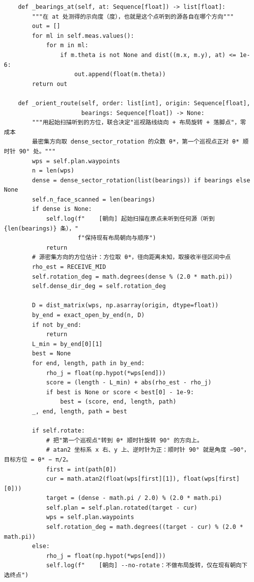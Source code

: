 \documentclass[UTF8, zihao=5,AutoFakeBold=2]{ctexart}
\begin{document}
\begin{lstlisting}
    def _bearings_at(self, at: Sequence[float]) -> list[float]:
        """在 at 处测得的示向度（度），也就是这个点听到的源各自在哪个方向"""
        out = []
        for ml in self.meas.values():
            for m in ml:
                if m.theta is not None and dist((m.x, m.y), at) <= 1e-6:
                    out.append(float(m.theta))
        return out

    def _orient_route(self, order: list[int], origin: Sequence[float],
                      bearings: Sequence[float]) -> None:
        """用起始扫描听到的方位，联合决定"巡视路线绕向 + 布局旋转 + 落脚点"，零成本
        最密集方向取 dense_sector_rotation 的众数 θ*，第一个巡视点正对 θ* 顺时针 90° 处。"""
        wps = self.plan.waypoints
        n = len(wps)
        dense = dense_sector_rotation(list(bearings)) if bearings else None
        self.n_face_scanned = len(bearings)
        if dense is None:
            self.log(f"    [朝向] 起始扫描在原点未听到任何源（听到 {len(bearings)} 条），"
                     f"保持现有布局朝向与顺序")
            return
        # 源密集方向的方位估计：方位取 θ*，径向距离未知，取接收半径区间中点
        rho_est = RECEIVE_MID
        self.rotation_deg = math.degrees(dense % (2.0 * math.pi))
        self.dense_dir_deg = self.rotation_deg

        D = dist_matrix(wps, np.asarray(origin, dtype=float))
        by_end = exact_open_by_end(n, D)
        if not by_end:
            return
        L_min = by_end[0][1]
        best = None
        for end, length, path in by_end:
            rho_j = float(np.hypot(*wps[end]))
            score = (length - L_min) + abs(rho_est - rho_j)
            if best is None or score < best[0] - 1e-9:
                best = (score, end, length, path)
        _, end, length, path = best

        if self.rotate:
            # 把"第一个巡视点"转到 θ* 顺时针旋转 90° 的方向上。
            # atan2 坐标系 x 右、y 上、逆时针为正：顺时针 90° 就是角度 −90°，目标方位 = θ* − π/2。
            first = int(path[0])
            cur = math.atan2(float(wps[first][1]), float(wps[first][0]))
            target = (dense - math.pi / 2.0) % (2.0 * math.pi)
            self.plan = self.plan.rotated(target - cur)
            wps = self.plan.waypoints
            self.rotation_deg = math.degrees((target - cur) % (2.0 * math.pi))
        else:
            rho_j = float(np.hypot(*wps[end]))
            self.log(f"    [朝向] --no-rotate：不做布局旋转，仅在现有朝向下选终点")


\end{lstlisting}
\end{document}
